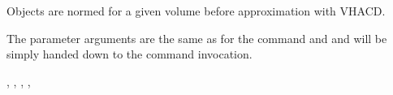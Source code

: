 \documentclass[letterpaper,10pt,english]{sphinxmanual}
\begin{document}
Objects are normed for a given volume before approximation with VHACD.

The parameter arguments are the same as for the command {\hyperref[\detokenize{pk_src.vhacd:vhacd}]{}} and {\hyperref[\detokenize{pk_src.intersection:intersection}]{}} and will be simply handed
down to the command invocation.

 {\hyperref[\detokenize{pk_src.collision_tet_tet:collision-tet-tet}]{}}, {\hyperref[\detokenize{pk_src.intersection_tet_tet:intersection-tet-tet}]{}}, {\hyperref[\detokenize{pk_src.getVolume:getvolume}]{}}, {\hyperref[\detokenize{pk_src.vhacd:vhacd}]{}}, {\hyperref[\detokenize{pk_src.intersection:intersection}]{}}
\end{document}
